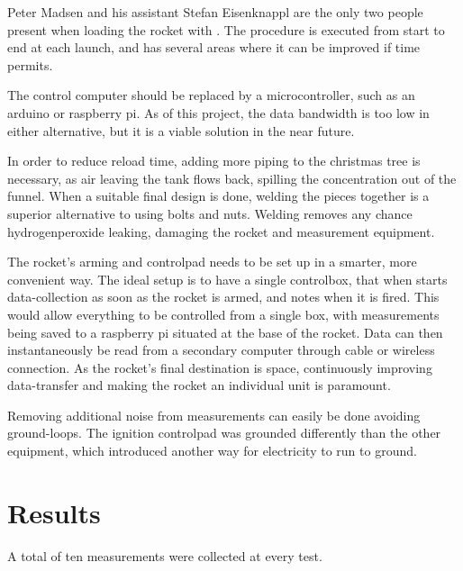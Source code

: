 Peter Madsen and his assistant Stefan Eisenknappl are the only two people present when loading the rocket with . The procedure is executed from start to end at each launch, and has several areas where it can be improved if time permits.

The control computer should be replaced by a microcontroller, such as an arduino or raspberry pi. As of this project, the data bandwidth is too low in either alternative, but it is a viable solution in the near future.

In order to reduce reload time, adding more piping to the christmas tree is necessary, as air leaving the  tank flows back, spilling the  concentration out of the funnel. When a suitable final design is done, welding the pieces together is a superior alternative to using bolts and nuts. Welding removes any chance hydrogenperoxide leaking, damaging the rocket and measurement equipment.

The rocket's arming and controlpad needs to be set up in a smarter, more convenient way. The ideal setup is to have a single controlbox, that when starts data-collection as soon as the rocket is armed, and notes when it is fired. This would allow everything to be controlled from a single box, with measurements being saved to a raspberry pi situated at the base of the rocket. Data can then instantaneously be read from a secondary computer through cable or wireless connection. As the rocket's final destination is space, continuously improving data-transfer and making the rocket an individual unit is paramount.

Removing additional noise from measurements can easily be done avoiding ground-loops. The ignition controlpad was grounded differently than the other equipment, which introduced another way for electricity to run to ground.

\section{Results}

A total of ten measurements were collected at every test.
